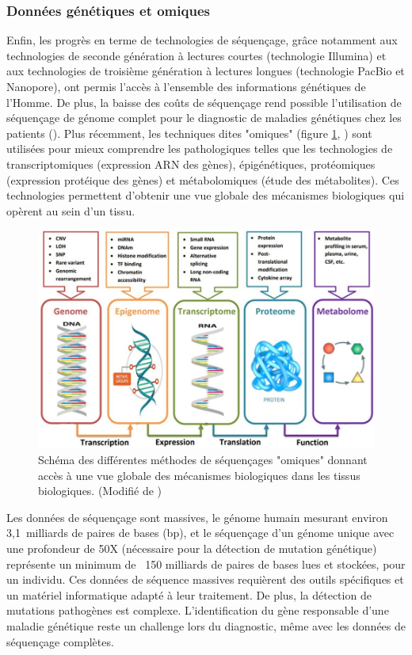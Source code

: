\subsubsection{Données génétiques et omiques}
Enfin, les progrès en terme de technologies de séquençage, grâce notamment aux technologies de seconde génération à lectures courtes (technologie Illumina) et aux technologies de troisième génération à lectures longues (technologie PacBio et Nanopore), ont permis l'accès à l'ensemble des informations génétiques de l'Homme. De plus, la baisse des coûts de séquençage rend possible l'utilisation de séquençage de génome complet pour le diagnostic de maladies génétiques chez les patients (\cite{rabbani_next-generation_2012}). Plus récemment, les techniques dites "omiques" (figure \ref{fig:intro-omics}, \cite{momeni_survey_2020}) sont utilisées pour mieux comprendre les pathologiques telles que les technologies de transcriptomiques (expression ARN des gènes), épigénétiques, protéomiques (expression protéique des gènes) et métabolomiques (étude des métabolites). Ces technologies permettent d'obtenir une vue globale des mécanismes biologiques qui opèrent au sein d'un tissu. 
\begin{figure}[!ht]
 \centering
 \includegraphics[width=1\textwidth]{figures/intro_omics.png}
 \caption[Méthodes de séquençages "omiques"]{Schéma des différentes méthodes de séquençages "omiques" donnant accès à une vue globale des mécanismes biologiques dans les tissus biologiques. (Modifié de \cite{momeni_survey_2020})}
 \label{fig:intro-omics}
\end{figure}
Les données de séquençage sont massives, le génome humain mesurant environ 3,1~milliards de paires de bases (bp), et le séquençage d'un génome unique avec une profondeur de 50X (nécessaire pour la détection de mutation génétique) représente un minimum de ~150 milliards de paires de bases lues et stockées, pour un individu. Ces données de séquence massives requièrent des outils spécifiques et un matériel informatique adapté à leur traitement. De plus, la détection de mutations pathogènes est complexe. L'identification du gène responsable d'une maladie génétique reste un challenge lors du diagnostic, même avec les données de séquençage complètes.

